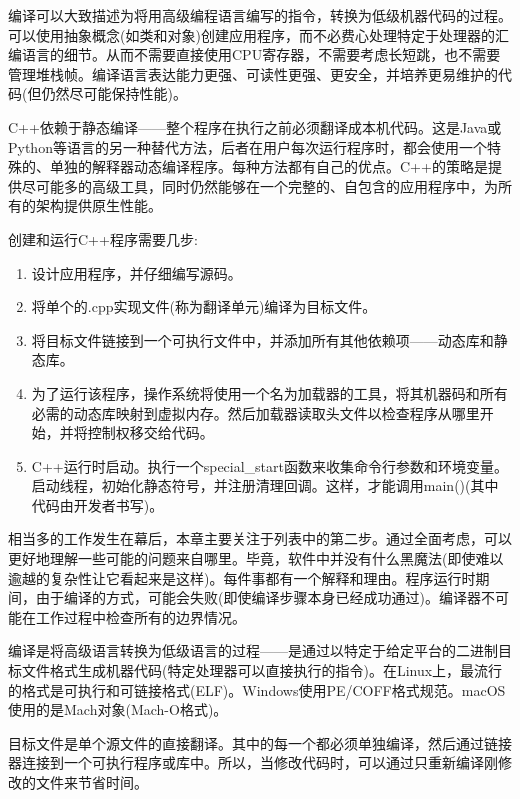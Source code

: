 
编译可以大致描述为将用高级编程语言编写的指令，转换为低级机器代码的过程。可以使用抽象概念(如类和对象)创建应用程序，而不必费心处理特定于处理器的汇编语言的细节。从而不需要直接使用CPU寄存器，不需要考虑长短跳，也不需要管理堆栈帧。编译语言表达能力更强、可读性更强、更安全，并培养更易维护的代码(但仍然尽可能保持性能)。

C++依赖于静态编译——整个程序在执行之前必须翻译成本机代码。这是Java或Python等语言的另一种替代方法，后者在用户每次运行程序时，都会使用一个特殊的、单独的解释器动态编译程序。每种方法都有自己的优点。C++的策略是提供尽可能多的高级工具，同时仍然能够在一个完整的、自包含的应用程序中，为所有的架构提供原生性能。

创建和运行C++程序需要几步:

\begin{enumerate}
\item 
设计应用程序，并仔细编写源码。

\item 
将单个的.cpp实现文件(称为翻译单元)编译为目标文件。

\item 
将目标文件链接到一个可执行文件中，并添加所有其他依赖项——动态库和静态库。

\item 
为了运行该程序，操作系统将使用一个名为加载器的工具，将其机器码和所有必需的动态库映射到虚拟内存。然后加载器读取头文件以检查程序从哪里开始，并将控制权移交给代码。

\item 
C++运行时启动。执行一个special\_start函数来收集命令行参数和环境变量。启动线程，初始化静态符号，并注册清理回调。这样，才能调用main()(其中代码由开发者书写)。
\end{enumerate}

相当多的工作发生在幕后，本章主要关注于列表中的第二步。通过全面考虑，可以更好地理解一些可能的问题来自哪里。毕竟，软件中并没有什么黑魔法(即使难以逾越的复杂性让它看起来是这样)。每件事都有一个解释和理由。程序运行时期间，由于编译的方式，可能会失败(即使编译步骤本身已经成功通过)。编译器不可能在工作过程中检查所有的边界情况。


编译是将高级语言转换为低级语言的过程——是通过以特定于给定平台的二进制目标文件格式生成机器代码(特定处理器可以直接执行的指令)。在Linux上，最流行的格式是可执行和可链接格式(ELF)。Windows使用PE/COFF格式规范。macOS使用的是Mach对象(Mach-O格式)。

目标文件是单个源文件的直接翻译。其中的每一个都必须单独编译，然后通过链接器连接到一个可执行程序或库中。所以，当修改代码时，可以通过只重新编译刚修改的文件来节省时间。


